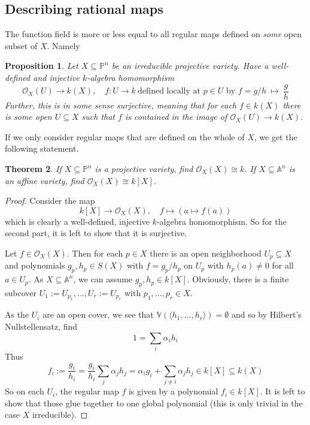 \documentclass{scrartcl}
\newcommand{\V}{\mathbb{V}}
\newtheorem{prop}{Proposition}[section]
\newtheorem{theorem}[prop]{Theorem}
\theoremstyle{definition}
\begin{document}
\subsection{Describing rational maps}
The function field is more or less equal to all regular maps defined on \emph{some} open subset of $X$. Namely
\begin{prop}
    Let $X \subseteq \mathbb{P}^n$ be an irreducible projective variety.
    Have a well-defined and injective $k$-algebra homomorphism
    \begin{equation*}
        \mathcal{O}_X(U) \to k(X), \quad f: U \to k \ \text{defined locally at $p \in U$ by $f = g/h$} \ \mapsto \ \frac g h
    \end{equation*}
    Further, this is in some sense surjective, meaning that for each $f \in k(X)$ there is some open $U \subseteq X$ such that $f$ is contained in the image of $\mathcal{O}_X(U) \to k(X)$.
\end{prop}
If we only consider regular maps that are defined on the whole of $X$, we get the following statement.
\begin{theorem}
    If $X \subseteq \mathbb{P}^n$ is a projective variety, find $\mathcal{O}_X(X) \cong k$.
    If $X \subseteq \mathbb{A}^n$ is an affine variety, find $\mathcal{O}_X(X) \cong k[X]$.
\end{theorem}
\begin{proof}
    Consider the map
    \begin{equation*}
        k[X] \to \mathcal{O}_X(X), \quad f \mapsto (a \mapsto f(a))
    \end{equation*}
    which is clearly a well-defined, injective $k$-algebra homomorphism.
    So for the second part, it is left to show that it is surjective.

    Let $f \in \mathcal{O}_X(X)$.
    Then for each $p \in X$ there is an open neighborhood $U_p \subseteq X$ and polynomials $g_p, h_p \in S(X)$ with $f = g_p/h_p$ on $U_p$ with $h_p(a) \neq 0$ for all $a \in U_p$.
    As $X \subseteq \mathbb{A}^n$, we can assume $g_p, h_p \in k[X]$.
    Obviously, there is a finite subcover $U_1 := U_{p_1}, ..., U_r := U_{p_r}$ with $p_1, ..., p_r \in X$.

    As the $U_i$ are an open cover, we see that $\V(\langle h_1, ..., h_r \rangle) = \emptyset$ and so by Hilbert's Nullstellensatz, find
    \begin{equation*}
        1 = \sum_i \alpha_i h_i
    \end{equation*}
    Thus
    \begin{equation*}
        f_i := \frac {g_i} {h_i} = \frac {g_i} {h_i} \sum_j \alpha_j h_j = \alpha_i g_i + \sum_{j \neq i} \alpha_j h_j \in k[X] \subseteq k(X)
    \end{equation*}
    So on each $U_i$, the regular map $f$ is given by a polynomial $f_i \in k[X]$.
    It is left to show that those glue together to one global polynomial (this is only trivial in the case $X$ irreducible).
\end{proof}
\end{document}
